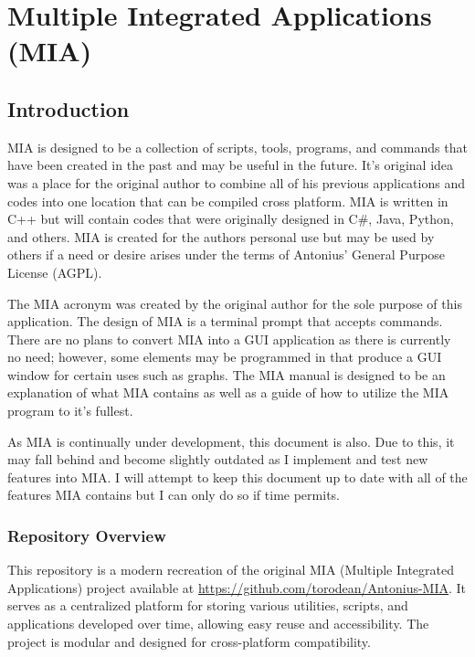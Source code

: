 \chapter{Multiple Integrated Applications (MIA)}
\pagestyle{fancy}

\section{Introduction}

MIA is designed to be a collection of scripts, tools, programs, and commands that have been created in the past and may be useful in the future. It's original idea was a place for the original author to combine all of his previous applications and codes into one location that can be compiled cross platform. MIA is written in C++ but will contain codes that were originally designed in C\#, Java, Python, and others. MIA is created for the authors personal use but may be used by others if a need or desire arises under the terms of Antonius’ General Purpose License (AGPL). 

The MIA acronym was created by the original author for the sole purpose of this application. The design of MIA is a terminal prompt that accepts commands. There are no plans to convert MIA into a GUI application as there is currently no need; however, some elements may be programmed in that produce a GUI window for certain uses such as graphs. The MIA manual is designed to be an explanation of what MIA contains as well as a guide of how to utilize the MIA program to it's fullest. 

As MIA is continually under development, this document is also. Due to this, it may fall behind and become slightly outdated as I implement and test new features into MIA. I will attempt to keep this document up to date with all of the features MIA contains but I can only do so if time permits.





\subsection{Repository Overview}

This repository is a modern recreation of the original MIA (Multiple Integrated Applications) project available at \url{https://github.com/torodean/Antonius-MIA}. It serves as a centralized platform for storing various utilities, scripts, and applications developed over time, allowing easy reuse and accessibility. The project is modular and designed for cross-platform compatibility.

